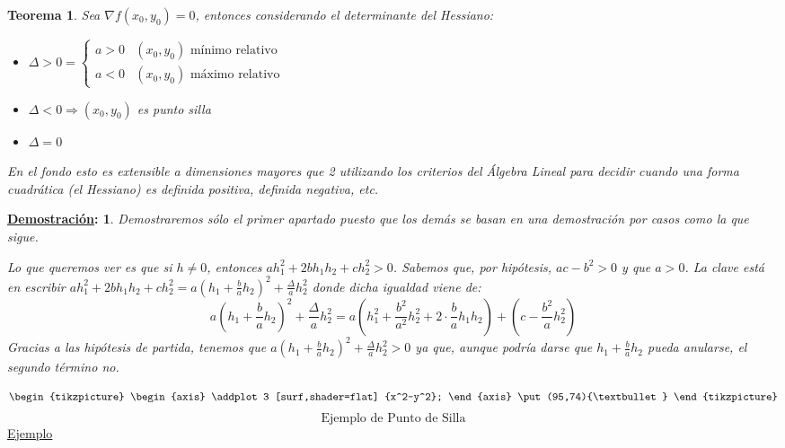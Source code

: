 \documentclass[10pt,a4paper,openright]{book}
\theoremstyle{break}
\newtheorem*{theo}{Teorema}
\newtheorem*{demo}{\underline{Demostración}:}
\begin{document}
\begin{theo}
Sea $\nabla f (x_0, y_0) = 0$, entonces considerando el determinante del Hessiano:
\begin{itemize}
\item $\Delta > 0 = \begin{cases} a > 0 & (x_0, y_0) \mbox{ mínimo relativo} \\ a < 0 & (x_0, y_0) \mbox{ máximo relativo}\end{cases}$
\item $\Delta < 0 \Rightarrow (x_0, y_0)$ es punto silla
\item $\Delta = 0$
\end{itemize}
En el fondo esto es extensible a dimensiones mayores que 2 utilizando los criterios del Álgebra Lineal para decidir cuando una forma cuadrática (el Hessiano) es definida positiva, definida negativa, etc.
\end{theo}

\begin{demo}
Demostraremos sólo el primer apartado puesto que los demás se basan en una demostración por casos como la que sigue.

Lo que queremos ver es que si $h \neq 0$, entonces $ah_1^2 + 2bh_1h_2 + ch_2^2 > 0$. Sabemos que, por hipótesis, $ac - b^2 > 0$ y que $a > 0$. La clave está en escribir $ah_1^2 + 2bh_1h_2 + ch_2^2 = a \left( h_1 + \frac{b}{a} h_2 \right)^2 + \frac{\Delta}{a} h_2^2$ donde dicha igualdad viene de:
$$ a \left( h_1 + \frac{b}{a} h_2 \right)^2 + \frac{\Delta}{a} h_2^2 = a \left( h_1^2 + \frac{b^2}{a^2} h_2^2 + 2 \cdot \frac{b}{a} h_1 h_2\right) + \left( c - \frac{b^2}{a} h_2^2 \right)$$
Gracias a las hipótesis de partida, tenemos que $ a \left( h_1 + \frac{b}{a} h_2 \right)^2 + \frac{\Delta}{a} h_2^2 >0 $ ya que, aunque podría darse que $ h_1 + \frac{b}{a} h_2 $ pueda anularse, el segundo término no.
\end{demo}
$$
\begin{tikzpicture}
\begin{axis}
\addplot3 [surf,shader=flat] {x^2-y^2};
\end{axis}
\put(95,74){\textbullet}
\end{tikzpicture}$$
$$\mbox{Ejemplo de Punto de Silla}$$
\underline{Ejemplo}
\end{document}
